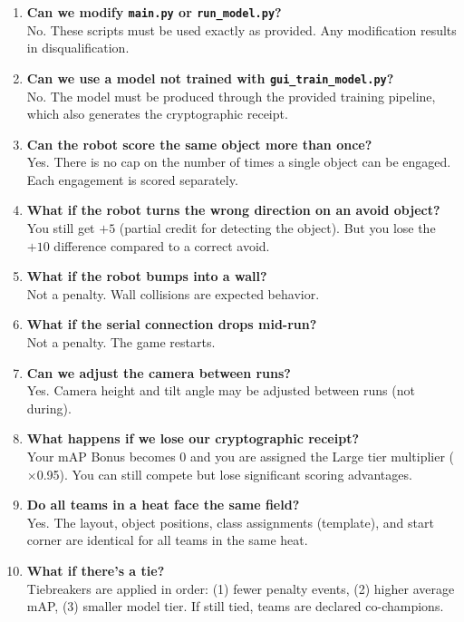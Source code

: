 \documentclass[a4]{article}
\begin{document}
\begin{enumerate}[label=\textbf{Q\arabic*:}, leftmargin=2.5em]
    \item \textbf{Can we modify \texttt{main.py} or \texttt{run\_model.py}?} \\
    No. These scripts must be used exactly as provided. Any modification results in disqualification.

    \item \textbf{Can we use a model not trained with \texttt{gui\_train\_model.py}?} \\
    No. The model must be produced through the provided training pipeline, which also generates the cryptographic receipt.

    \item \textbf{Can the robot score the same object more than once?} \\
    Yes. There is no cap on the number of times a single object can be engaged. Each engagement is scored separately.

    \item \textbf{What if the robot turns the wrong direction on an avoid object?} \\
    You still get $+5$ (partial credit for detecting the object). But you lose the $+10$ difference compared to a correct avoid.

    \item \textbf{What if the robot bumps into a wall?} \\
    Not a penalty. Wall collisions are expected behavior.

    \item \textbf{What if the serial connection drops mid-run?} \\
    Not a penalty. The game restarts.

    \item \textbf{Can we adjust the camera between runs?} \\
    Yes. Camera height and tilt angle may be adjusted between runs (not during).

    \item \textbf{What happens if we lose our cryptographic receipt?} \\
    Your mAP Bonus becomes 0 and you are assigned the Large tier multiplier ($\times$0.95). You can still compete but lose significant scoring advantages.

    \item \textbf{Do all teams in a heat face the same field?} \\
    Yes. The layout, object positions, class assignments (template), and start corner are identical for all teams in the same heat.

    \item \textbf{What if there's a tie?} \\
    Tiebreakers are applied in order: (1) fewer penalty events, (2) higher average mAP, (3) smaller model tier. If still tied, teams are declared co-champions.
\end{enumerate}
\end{document}
